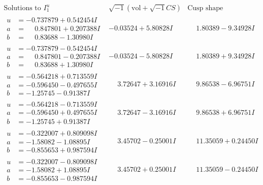 \documentclass[1p]{elsarticle_modified}
\theoremstyle{definition}
\newcommand{\I}{\sqrt{-1}}
\begin{document}
$$\begin{array}{c|c|c}  
\text{Solutions to }I^u_{1}& \I (\text{vol} + \sqrt{-1}CS) & \text{Cusp shape}\\
 \hline 
\begin{aligned}
u &= -0.737879 + 0.542454 I \\
a &= \phantom{-}0.847801 + 0.207388 I \\
b &= \phantom{-}0.83688 - 1.30980 I\end{aligned}
 & -0.03524 + 5.80828 I & \phantom{-}1.80389 - 9.34928 I \\ \hline\begin{aligned}
u &= -0.737879 - 0.542454 I \\
a &= \phantom{-}0.847801 - 0.207388 I \\
b &= \phantom{-}0.83688 + 1.30980 I\end{aligned}
 & -0.03524 - 5.80828 I & \phantom{-}1.80389 + 9.34928 I \\ \hline\begin{aligned}
u &= -0.564218 + 0.713559 I \\
a &= -0.596450 - 0.497655 I \\
b &= -1.25745 - 0.91387 I\end{aligned}
 & \phantom{-}3.72647 + 3.16916 I & \phantom{-}9.86538 - 6.96751 I \\ \hline\begin{aligned}
u &= -0.564218 - 0.713559 I \\
a &= -0.596450 + 0.497655 I \\
b &= -1.25745 + 0.91387 I\end{aligned}
 & \phantom{-}3.72647 - 3.16916 I & \phantom{-}9.86538 + 6.96751 I \\ \hline\begin{aligned}
u &= -0.322007 + 0.809098 I \\
a &= -1.58082 - 1.08895 I \\
b &= -0.855653 + 0.987594 I\end{aligned}
 & \phantom{-}3.45702 - 0.25001 I & \phantom{-}11.35059 + 0.24450 I \\ \hline\begin{aligned}
u &= -0.322007 - 0.809098 I \\
a &= -1.58082 + 1.08895 I \\
b &= -0.855653 - 0.987594 I\end{aligned}
 & \phantom{-}3.45702 + 0.25001 I & \phantom{-}11.35059 - 0.24450 I \\ \hline\begin{aligned}

\end{aligned}
\end{array}$$
\end{document}
